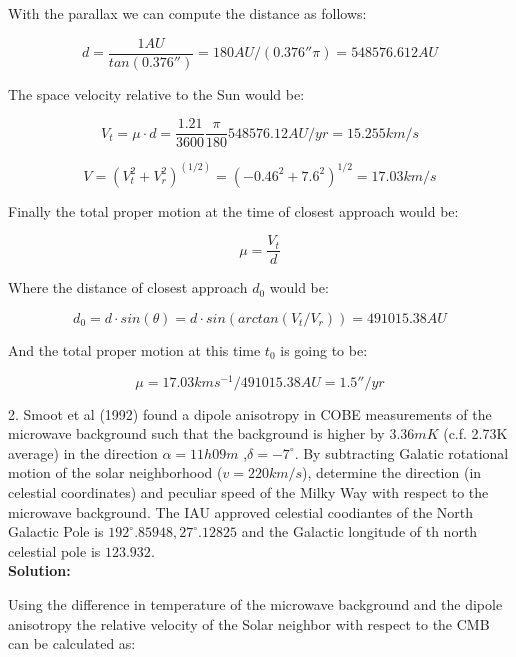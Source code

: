 \documentclass[14pt]{article}
\begin{document}
With the parallax we can compute the distance as follows:

\begin{equation}
d = \dfrac{1AU}{tan(0.376'')} = 180 AU /(0.376'' \pi) = 548576.612 AU
\end{equation}

The space velocity relative to the Sun would be:

\begin{equation}
V_t = \mu \cdot d = \dfrac{1.21}{3600} \dfrac{\pi}{180} 548576.12 AU
/yr = 15.255 km/s
\end{equation}

\begin{equation}
V = (V_t^2 + V_r^2)^{(1/2)} = (-0.46^2 + 7.6^2)^{1/2} = 17.03 km/s
\end{equation}

Finally the total proper motion at the time of closest approach would
be:

\begin{equation}
\mu = \dfrac{V_t}{d}
\end{equation}

Where the distance of closest approach $d_0$ would be:

\begin{equation}
d_0 = d \cdot sin(\theta) = d \cdot sin(arctan(V_t/V_r)) =  491015.38
 AU
\end{equation}

And the total proper motion at this time $t_0$ is going to be:

\begin{equation}
\mu = 17.03 kms^{-1} / 491015.38 AU = 1.5''/yr
\end{equation}

2. Smoot et al (1992) found a dipole anisotropy in COBE measurements
of the microwave background such that the background is higher by
$3.36mK$ (c.f. 2.73K average) in the direction $\alpha=11h09m$
,$\delta=-7^{\circ}$. By subtracting Galatic rotational motion of
the solar neighborhood ($v=220km/s$), determine the direction (in
celestial coordinates) and peculiar speed of the Milky Way with
respect to the microwave background. The IAU approved celestial
coodiantes of the North Galactic Pole is $192^{\circ}.85948,
27^{\circ}.12825$ and the Galactic longitude of th north celestial pole
is $123.932$.\\

\textbf{Solution:}

Using the difference in temperature of the microwave background and
the dipole anisotropy the relative velocity of the Solar neighbor with 
respect to the CMB can be calculated as:
\end{document}
